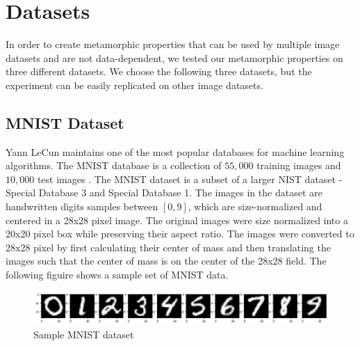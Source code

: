 \section{Datasets}\label{dataset}
In order to create metamorphic properties that can be used by multiple image datasets and are not data-dependent, we tested our metamorphic properties on three different datasets. We choose the following three datasets, but the experiment can be easily replicated on other image datasets.

\subsection{MNIST Dataset}
Yann LeCun maintains one of the most popular databases for machine learning algorithms. The MNIST database is a collection of $55,000$ training images and $10,000$ test images \cite{MNIST}.  The MNIST dataset is a subset of a larger NIST dataset - Special Database 3 and Special Database 1. The images in the dataset are handwritten digits samples between $[0,9]$, which are size-normalized and centered in a 28x28 pixel image. The original images were size normalized into a 20x20 pixel box while preserving their aspect ratio. The images were converted to 28x28 pixel by first calculating their center of mass and then translating the images such that the center of mass is on the center of the 28x28 field. The following figuire shows a sample set of MNIST data.
\begin{figure}[htb!]
\centering
    \centering
    \includegraphics[width=\linewidth]{images/digit.png}
    \caption{Sample MNIST dataset}
    \label{fig:EMNIST MNIST dataset}
\end{figure}
      
